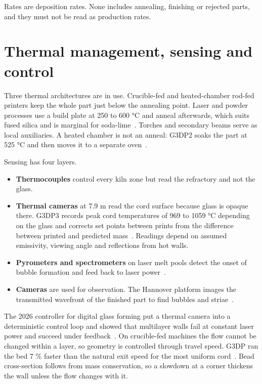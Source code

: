 \documentclass[10pt,a4paper]{article}
\begin{document}
Rates are deposition rates. None includes annealing, finishing or rejected parts, and they must not be read as production rates.

\section{Thermal management, sensing and control}

Three thermal architectures are in use. Crucible-fed and heated-chamber rod-fed printers keep the whole part just below the annealing point. Laser and powder processes use a build plate at 250 to 600 °C and anneal afterwards, which suits fused silica and is marginal for soda-lime~\citep{datsiou2019,spirrett2023}. Torches and secondary beams serve as local auxiliaries. A heated chamber is not an anneal: G3DP2 soaks the part at 525 °C and then moves it to a separate oven~\citep{inamura2018}.

Sensing has four layers.

\begin{itemize}
  \item \textbf{Thermocouples} control every kiln zone but read the refractory and not the glass.
  \item \textbf{Thermal cameras} at 7.9 \textmu{}m read the cord surface because glass is opaque there. G3DP3 records peak cord temperatures of 969 to 1059 °C depending on the glass and corrects set points between prints from the difference between printed and predicted mass~\citep{stern2024cgc}. Readings depend on assumed emissivity, viewing angle and reflections from hot walls.
  \item \textbf{Pyrometers and spectrometers} on laser melt pools detect the onset of bubble formation and feed back to laser power~\citep{luo2017heat,lgd2025tempctrl}.
  \item \textbf{Cameras} are used for observation. The Hannover platform images the transmitted wavefront of the finished part to find bubbles and striae~\citep{lgd2024homog}.
\end{itemize}

The 2026 controller for digital glass forming put a thermal camera into a deterministic control loop and showed that multilayer walls fail at constant laser power and succeed under feedback~\citep{dgf2026control}. On crucible-fed machines the flow cannot be changed within a layer, so geometry is controlled through travel speed. G3DP ran the bed 7 \% faster than the natural exit speed for the most uniform cord~\citep{klein2015}. Bead cross-section follows from mass conservation, so a slowdown at a corner thickens the wall unless the flow changes with it.
\end{document}
